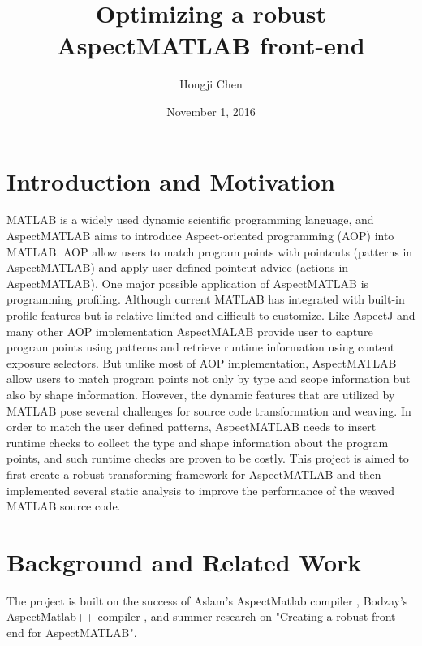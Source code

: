 \documentclass{comp621}
\title{Optimizing a robust AspectMATLAB front-end}
\author{Hongji Chen}
\date{November 1, 2016}
\begin{document}
\MakeTitlePage

\tableofcontents


\clearpage


\section{Introduction and Motivation}

MATLAB is a widely used dynamic scientific programming language, and
AspectMATLAB aims to introduce Aspect-oriented programming (AOP) into MATLAB. 
AOP allow users to match program points with pointcuts (patterns in
AspectMATLAB) and apply  user-defined pointcut advice (actions in
AspectMATLAB).  One major possible application of AspectMATLAB is programming
profiling. Although current MATLAB has integrated with built-in profile
features but is relative limited and difficult to customize. Like AspectJ and
many other AOP implementation AspectMALAB provide user to capture program
points using patterns and retrieve runtime information using content exposure
selectors. But unlike most of AOP implementation, AspectMATLAB allow users to
match program points not only by type and scope information but also by shape
information. However, the dynamic features that are utilized by MATLAB pose
several challenges for source code transformation and weaving. In order to
match the user defined patterns, AspectMATLAB needs to insert runtime checks to
collect the type and shape information about the program points, and such
runtime checks are proven to be costly. This project is aimed to first create a
robust transforming framework for AspectMATLAB and then implemented several
static analysis to improve the performance of the weaved MATLAB source code.

\section{Background and Related Work}

The project is built on the success of Aslam's AspectMatlab
compiler\cite{AspectMATLABpaper} , Bodzay's AspectMatlab++ compiler
\cite{AspectMATLABPPpaper} , and summer research on "Creating a robust
front-end for AspectMATLAB". 
\end{document}

